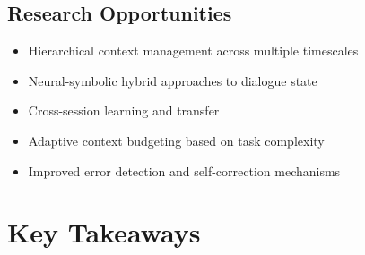 \documentclass[11pt,letterpaper]{article}
\begin{document}
\subsection{Research Opportunities}
\begin{itemize}[leftmargin=*]
    \item Hierarchical context management across multiple timescales
    \item Neural-symbolic hybrid approaches to dialogue state
    \item Cross-session learning and transfer
    \item Adaptive context budgeting based on task complexity
    \item Improved error detection and self-correction mechanisms
\end{itemize}

\section*{Key Takeaways}
\end{document}

